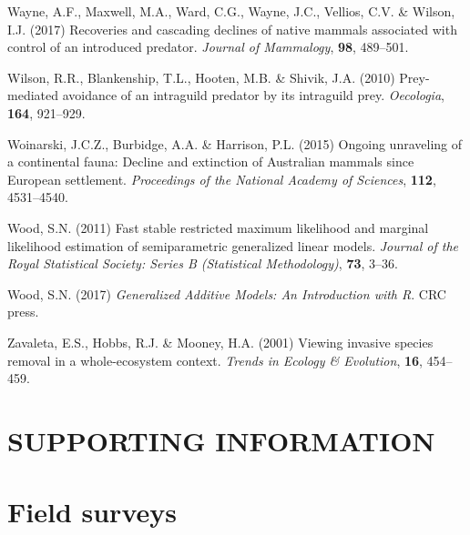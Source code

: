 \documentclass[]{elsarticle} %
\begin{document}
\leavevmode\hypertarget{ref-wayne2017recoveries}{}%
Wayne, A.F., Maxwell, M.A., Ward, C.G., Wayne, J.C., Vellios, C.V. \& Wilson, I.J. (2017) Recoveries and cascading declines of native mammals associated with control of an introduced predator. \emph{Journal of Mammalogy}, \textbf{98}, 489--501.

\leavevmode\hypertarget{ref-wilson2010prey}{}%
Wilson, R.R., Blankenship, T.L., Hooten, M.B. \& Shivik, J.A. (2010) Prey-mediated avoidance of an intraguild predator by its intraguild prey. \emph{Oecologia}, \textbf{164}, 921--929.

\leavevmode\hypertarget{ref-woinarski2015ongoing}{}%
Woinarski, J.C.Z., Burbidge, A.A. \& Harrison, P.L. (2015) Ongoing unraveling of a continental fauna: Decline and extinction of Australian mammals since European settlement. \emph{Proceedings of the National Academy of Sciences}, \textbf{112}, 4531--4540.

\leavevmode\hypertarget{ref-wood2011fast}{}%
Wood, S.N. (2011) Fast stable restricted maximum likelihood and marginal likelihood estimation of semiparametric generalized linear models. \emph{Journal of the Royal Statistical Society: Series B (Statistical Methodology)}, \textbf{73}, 3--36.

\leavevmode\hypertarget{ref-wood2017generalized}{}%
Wood, S.N. (2017) \emph{Generalized Additive Models: An Introduction with R}. CRC press.

\leavevmode\hypertarget{ref-zavaleta2001viewing}{}%
Zavaleta, E.S., Hobbs, R.J. \& Mooney, H.A. (2001) Viewing invasive species removal in a whole-ecosystem context. \emph{Trends in Ecology \& Evolution}, \textbf{16}, 454--459.

\newpage

\setcounter{table}{0}  \renewcommand{\thetable}{S\arabic{table}} \setcounter{figure}{0} \renewcommand{\thefigure}{S\arabic{figure}} \setcounter{section}{0} \renewcommand{\thesection}{S\arabic{section}}

\hypertarget{supporting-information}{%
\section*{SUPPORTING INFORMATION}\label{supporting-information}}

\hypertarget{density-app-field}{%
\section{Field surveys}\label{density-app-field}}
\end{document}
